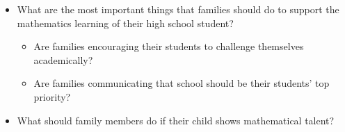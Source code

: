 {{\begin{itemize}
        \item What are the most important things that families should do to support the mathematics learning of their high school student?
          \begin{itemize}
            \item Are families encouraging their students to challenge themselves academically?

            \item Are families communicating that school should be their students' top priority?
          \end{itemize}\vspace{\baselineskip}

        \item What should family members do if their child shows mathematical talent?
      \end{itemize}}
  }
